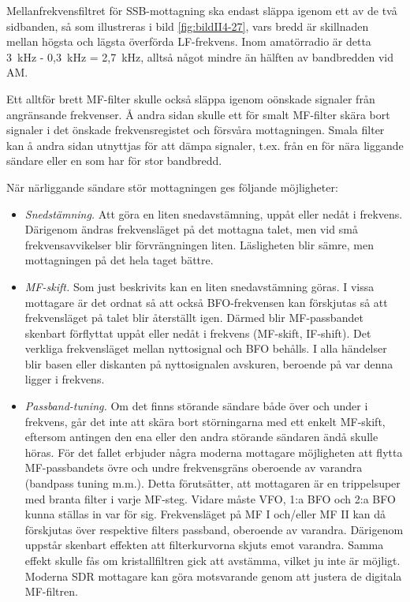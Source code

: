 Mellanfrekvensfiltret för SSB-mottagning ska endast släppa igenom
ett av de två sidbanden, så som illustreras i bild \ref{fig:bildII4-27},
vars bredd är skillnaden mellan högsta och lägsta överförda LF-frekvens.
Inom amatörradio är detta 3~kHz - 0,3~kHz = 2,7~kHz, alltså något mindre än
hälften av bandbredden vid AM.

Ett alltför brett MF-filter skulle också släppa igenom oönskade
signaler från angränsande frekvenser.
Å andra sidan skulle ett för smalt MF-filter skära bort signaler i det
önskade frekvensregistet och försvåra mottagningen.
Smala filter kan å andra sidan utnyttjas för att dämpa signaler, t.ex. från
en för nära liggande sändare eller en som har för stor bandbredd.

När närliggande sändare stör mottagningen ges följande möjligheter:
\begin{itemize}
\item \emph{Snedstämning.}
  Att göra en liten snedavstämning, uppåt eller nedåt i frekvens.
  Därigenom ändras frekvensläget på det mottagna talet, men vid små
  frekvensavvikelser blir förvrängningen liten.
  Läsligheten blir sämre, men mottagningen på det hela taget bättre.

\item \emph{MF-skift.}
  Som just beskrivits kan en liten snedavstämning göras.
  I vissa mottagare är det ordnat så att också BFO-frekvensen kan förskjutas
  så att frekvensläget på talet blir återställt igen.
  Därmed blir MF-passbandet skenbart förflyttat uppåt eller nedåt i frekvens
  (MF-skift, IF-shift).
  Det verkliga frekvensläget mellan nyttosignal och BFO behålls.
  I alla händelser blir basen eller diskanten på nyttosignalen avskuren,
  beroende på var denna ligger i frekvens.

\item \emph{Passband-tuning.}
  Om det finns störande sändare både över och under i frekvens, går det inte
  att skära bort störningarna med ett enkelt MF-skift, eftersom antingen den
  ena eller den andra störande sändaren ändå skulle höras.
  För det fallet erbjuder några moderna mottagare möjligheten att flytta
  MF-passbandets övre och undre frekvensgräns oberoende av varandra (bandpass
  tuning m.m.).
  Detta förutsätter, att mottagaren är en trippelsuper med branta filter i
  varje MF-steg.
  Vidare måste VFO, 1:a BFO och 2:a BFO kunna ställas in var för sig.
  Frekvensläget på MF I och/eller MF II kan då förskjutas över respektive
  filters passband, oberoende av varandra.
  Därigenom uppstår skenbart effekten att filterkurvorna skjuts emot varandra.
  Samma effekt skulle fås om kristallfiltren gick att avstämma, vilket ju inte
  är möjligt.
  Moderna SDR mottagare kan göra motsvarande genom att justera de digitala
  MF-filtren.
\end{itemize}

